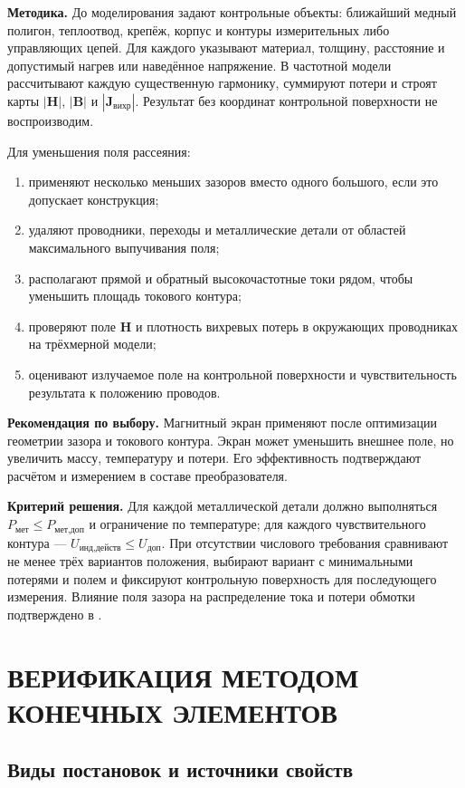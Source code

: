 \documentclass[14pt,a4paper]{extarticle}
\newcommand{\method}{\par\noindent\textbf{Методика.} }
\newcommand{\recommend}{\par\noindent\textbf{Рекомендация по выбору.} }
\newcommand{\criterion}{\par\noindent\textbf{Критерий решения.} }
\begin{document}
\method До моделирования задают контрольные объекты: ближайший медный
полигон, теплоотвод, крепёж, корпус и контуры измерительных либо управляющих
цепей. Для каждого указывают материал, толщину, расстояние и допустимый
нагрев или наведённое напряжение. В частотной модели рассчитывают каждую
существенную гармонику, суммируют потери и строят карты
$|\mathbf H|$, $|\mathbf B|$ и $|\mathbf J_{\text{вихр}}|$. Результат без
координат контрольной поверхности не воспроизводим.

Для уменьшения поля рассеяния:
\begin{enumerate}
 \item применяют несколько меньших зазоров вместо одного большого,
 если это допускает конструкция;
 \item удаляют проводники, переходы и металлические детали от областей
 максимального выпучивания поля;
 \item располагают прямой и обратный высокочастотные токи рядом, чтобы
 уменьшить площадь токового контура;
 \item проверяют поле $\mathbf H$ и плотность вихревых потерь в
 окружающих проводниках на трёхмерной модели;
 \item оценивают излучаемое поле на контрольной поверхности и
 чувствительность результата к положению проводов.
\end{enumerate}

\recommend Магнитный экран применяют после оптимизации геометрии
зазора и токового контура. Экран может уменьшить внешнее поле, но
увеличить массу, температуру и потери. Его эффективность подтверждают
расчётом и измерением в составе преобразователя.

\criterion Для каждой металлической детали должно выполняться
$P_{\text{мет}}\leq P_{\text{мет,доп}}$ и ограничение по температуре; для
каждого чувствительного контура ---
$U_{\text{инд,действ}}\leq U_{\text{доп}}$. При отсутствии числового
требования сравнивают не менее трёх вариантов положения, выбирают вариант с
минимальными потерями и полем и фиксируют контрольную поверхность для
последующего измерения. Влияние поля зазора на распределение тока и потери
обмотки подтверждено в \cite{schaefer,ewald_litz,meng}.

\section{ВЕРИФИКАЦИЯ МЕТОДОМ КОНЕЧНЫХ ЭЛЕМЕНТОВ}
\label{sec:fem}

\subsection{Виды постановок и источники свойств}
\end{document}
